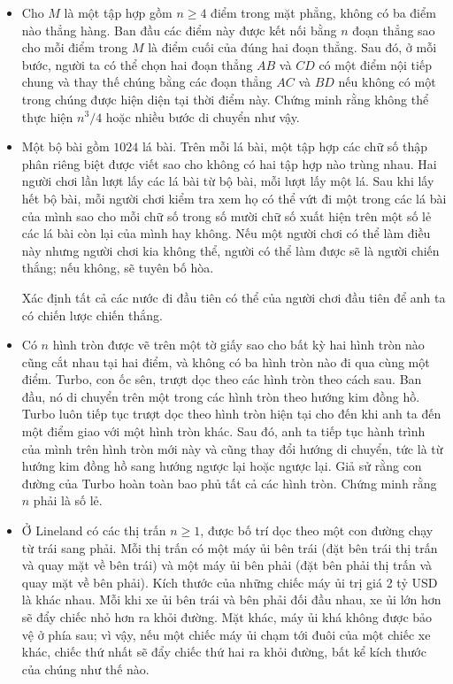 \documentclass[11pt]{scrartcl}
\begin{document}
\begin{itemize}[label=, leftmargin=0em, itemsep=-0em]
    \item \begin{btvn}
        Cho $M$ là một tập hợp gồm $n \geq 4$ điểm trong mặt phẳng, không có ba điểm nào thẳng hàng. Ban đầu các điểm này được kết nối bằng $n$ đoạn thẳng sao cho mỗi điểm trong $M$ là điểm cuối của đúng hai đoạn thẳng. Sau đó, ở mỗi bước, người ta có thể chọn hai đoạn thẳng $AB$ và $CD$ có một điểm nội tiếp chung và thay thế chúng bằng các đoạn thẳng $AC$ và $BD$ nếu không có một trong chúng được hiện diện tại thời điểm này. Chứng minh rằng không thể thực hiện $n^3 /4$ hoặc nhiều bước di chuyển như vậy.
    \end{btvn}
    \item \begin{btvn}
    Một bộ bài gồm $1024$ lá bài. Trên mỗi lá bài, một tập hợp các chữ số thập phân riêng biệt được viết sao cho không có hai tập hợp nào trùng nhau. Hai người chơi lần lượt lấy các lá bài từ bộ bài, mỗi lượt lấy một lá. Sau khi lấy hết bộ bài, mỗi người chơi kiểm tra xem họ có thể vứt đi một trong các lá bài của mình sao cho mỗi chữ số trong số mười chữ số xuất hiện trên một số lẻ các lá bài còn lại của mình hay không. Nếu một người chơi có thể làm điều này nhưng người chơi kia không thể, người có thể làm được sẽ là người chiến thắng; nếu không, sẽ tuyên bố hòa.

    
    Xác định tất cả các nước đi đầu tiên có thể của người chơi đầu tiên để anh ta có chiến lược chiến thắng.
    \end{btvn}

    \item \begin{btvn}
    Có $n$ hình tròn được vẽ trên một tờ giấy sao cho bất kỳ hai hình tròn nào cũng cắt nhau tại hai điểm, và không có ba hình tròn nào đi qua cùng một điểm. Turbo, con ốc sên, trượt dọc theo các hình tròn theo cách sau. Ban đầu, nó di chuyển trên một trong các hình tròn theo hướng kim đồng hồ. Turbo luôn tiếp tục trượt dọc theo hình tròn hiện tại cho đến khi anh ta đến một điểm giao với một hình tròn khác. Sau đó, anh ta tiếp tục hành trình của mình trên hình tròn mới này và cũng thay đổi hướng di chuyển, tức là từ hướng kim đồng hồ sang hướng ngược lại hoặc ngược lại.
    Giả sử rằng con đường của Turbo hoàn toàn bao phủ tất cả các hình tròn. Chứng minh rằng $n$ phải là số lẻ.
    \end{btvn}
    \item \begin{btvn}
        Ở Lineland có các thị trấn $n\geq1$, được bố trí dọc theo một con đường chạy từ trái sang phải. Mỗi thị trấn có một máy ủi bên trái (đặt bên trái thị trấn và quay mặt về bên trái) và một máy ủi bên phải (đặt bên phải thị trấn và quay mặt về bên phải). Kích thước của những chiếc máy ủi trị giá 2 tỷ USD là khác nhau. Mỗi khi xe ủi bên trái và bên phải đối đầu nhau, xe ủi lớn hơn sẽ đẩy chiếc nhỏ hơn ra khỏi đường. Mặt khác, máy ủi khá không được bảo vệ ở phía sau; vì vậy, nếu một chiếc máy ủi chạm tới đuôi của một chiếc xe khác, chiếc thứ nhất sẽ đẩy chiếc thứ hai ra khỏi đường, bất kể kích thước của chúng như thế nào.



\end{btvn}
\end{itemize}
\end{document}
